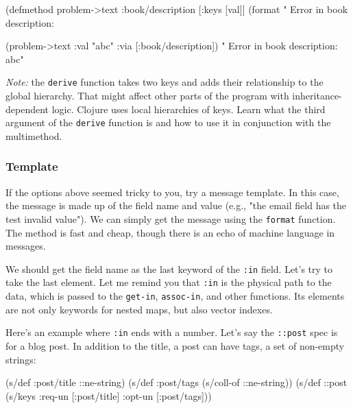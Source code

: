 \else

  \begin{clojure}
(defmethod problem->text :book/description
  [{:keys [val]}]
  (format  " Error in book description: %

(problem->text {:val "abc" :via [:book/description]})
" Error in book description: abc"
  \end{clojure}

\fi

\emph{Note:} the \verb|derive| function takes two keys and adds their relationship to the global hierarchy. That might affect other parts of the program with inheritance-dependent logic. Clojure uses local hierarchies of keys. Learn what the third argument of the \verb|derive| function is and how to use it in conjunction with the multimethod.

\subsubsection{Template}


If the options above seemed tricky to you, try a message template. In this case, the message is made up of the field name and value (e.g., "the email field has the test invalid value"). We can simply get the message using the \verb|format| function. The method is fast and cheap, though there is an echo of machine language in messages.

We should get the field name as the last keyword of the \verb|:in| field. Let's try to take the last element. Let me remind you that \verb|:in| is the physical path to the data, which is passed to the \verb|get-in|, \verb|assoc-in|, and other functions. Its elements are not only keywords for nested maps, but also vector indexes.

Here's an example where \verb|:in| ends with a number. Let's say the \verb|::post| spec is for a blog post. In addition to the title, a post can have tags, a set of non-empty strings:

\ifx\DEVICETYPE\MOBILE

\begin{english}
  \begin{clojure}
(s/def :post/title ::ne-string)
(s/def :post/tags
  (s/coll-of ::ne-string))
(s/def ::post
  (s/keys :req-un [:post/title]
          :opt-un [:post/tags]))
  \end{clojure}
\end{english}

